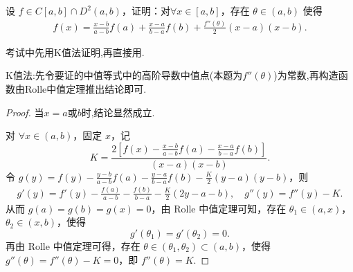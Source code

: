 \documentclass[../../main.tex]{subfiles}
\begin{document}
\begin{proposition}[Lagrange插值公式]\label{proposition:Lagrange插值公式}
设 $f \in C[a, b] \cap D^2(a, b)$，证明：对$\forall x \in [a, b]$，存在 $\theta \in (a, b)$ 使得
\begin{align*}
f(x) = \frac{x - b}{a - b} f(a) + \frac{x - a}{b - a} f(b) + \frac{f''(\theta)}{2} (x - a)(x - b).
\end{align*}
\end{proposition}
\begin{remark}
考试中先用K值法证明,再直接用.
\end{remark}
\begin{note}
K值法:先令要证的中值等式中的高阶导数中值点(本题为$f''(\theta)$)为常数,再构造函数由Rolle中值定理推出结论即可.
\end{note}
\begin{proof}
当$x=a$或$b$时,结论显然成立.

对 $\forall x\in (a,b)$，固定 $x$，记
\[
K=\frac{2\left[ f(x) -\frac{x-b}{a-b}f(a) -\frac{x-a}{b-a}f(b) \right]}{\left( x-a \right) \left( x-b \right)}.
\]
令 $g(y) =f(y) -\frac{y-b}{a-b}f(a) -\frac{y-a}{b-a}f(b) -\frac{K}{2}\left( y-a \right) \left( y-b \right)$，则
\begin{align*}
g'(y) = f'(y) -\frac{f(a)}{a-b}-\frac{f(b)}{b-a}-\frac{K}{2}\left( 2y-a-b \right),\quad 
g''(y) = f''(y) -K.
\end{align*}
从而 $g(a) = g(b) = g(x) = 0$，由 Rolle 中值定理可知，存在 $\theta_1 \in (a,x)$，$\theta_2 \in (x,b)$，使得
\[
g'(\theta_1) = g'(\theta_2) = 0.
\]
再由 Rolle 中值定理可得，存在 $\theta \in (\theta_1, \theta_2) \subset (a,b)$，使得 $g''(\theta) = f''(\theta) - K = 0$，即 $f''(\theta) = K$.
\end{proof}
\end{document}
